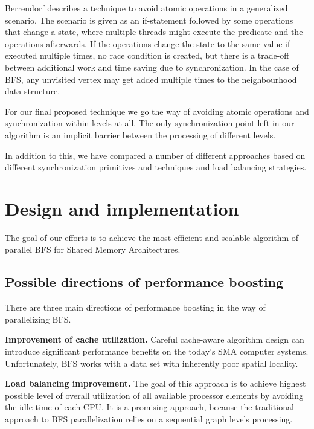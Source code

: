 \documentclass[letterpaper]{article}
\begin{document}
		Berrendorf\cite{Berrendorf:14} describes a technique to avoid atomic operations in a generalized scenario. 
		The scenario is given as an if-statement followed by some operations that change a state, where multiple threads might execute the predicate and the operations afterwards. 
		If the operations change the state to the same value if executed multiple times, no race condition is created, but there is a trade-off between additional work and time saving due to synchronization.
		In the case of BFS, any unvisited vertex may get added multiple times to the neighbourhood data structure.		
	
		For our final proposed technique we go the way of avoiding atomic operations and synchronization within levels at all.
		The only synchronization point left in our algorithm is an implicit barrier between the processing of different levels.
		
		In addition to this, we have compared a number of different approaches based on different synchronization primitives and techniques and load balancing strategies. %
	
	
	\section{Design and implementation}\label{sec:deim} %
		The goal of our efforts is to achieve the most efficient and scalable algorithm of parallel BFS for Shared Memory Architectures. 

		\subsection{Possible directions of performance boosting}
			There are three main directions of performance boosting in the way of parallelizing BFS.
			
			\textbf{Improvement of cache utilization.}
			Careful cache-aware algorithm design can introduce significant performance benefits on the today's SMA computer systems.
			Unfortunately, BFS works with a data set with inherently poor spatial locality. 
			
			\textbf{Load balancing improvement.} 
			The goal of this approach is to achieve highest possible level of overall utilization of all available processor elements by avoiding the idle time of each CPU.
			It is a promising approach, because the traditional approach to BFS parallelization relies on a sequential graph levels processing.
						
\end{document}
